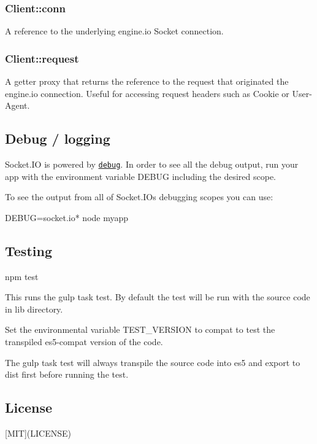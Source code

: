 \subsubsection*{Client\+::conn}

A reference to the underlying {\ttfamily engine.\+io} {\ttfamily Socket} connection.

\subsubsection*{Client\+::request}

A getter proxy that returns the reference to the {\ttfamily request} that originated the engine.\+io connection. Useful for accessing request headers such as {\ttfamily Cookie} or {\ttfamily User-\/\+Agent}.

\subsection*{Debug / logging}

Socket.\+IO is powered by \href{https://github.com/visionmedia/debug}{\tt debug}. In order to see all the debug output, run your app with the environment variable {\ttfamily D\+E\+B\+UG} including the desired scope.

To see the output from all of Socket.\+IO\textquotesingle{}s debugging scopes you can use\+:


\begin{DoxyCode}
DEBUG=socket.io* node myapp
\end{DoxyCode}


\subsection*{Testing}


\begin{DoxyCode}
npm test
\end{DoxyCode}
 This runs the {\ttfamily gulp} task {\ttfamily test}. By default the test will be run with the source code in {\ttfamily lib} directory.

Set the environmental variable {\ttfamily T\+E\+S\+T\+\_\+\+V\+E\+R\+S\+I\+ON} to {\ttfamily compat} to test the transpiled es5-\/compat version of the code.

The {\ttfamily gulp} task {\ttfamily test} will always transpile the source code into es5 and export to {\ttfamily dist} first before running the test.

\subsection*{License}

\mbox{[}M\+IT\mbox{]}(L\+I\+C\+E\+N\+SE) 